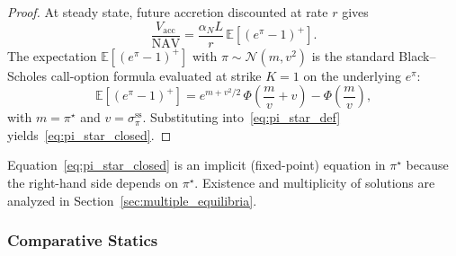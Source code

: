 \begin{proof}
  At steady state, future accretion discounted at rate $r$ gives
  \[
    \frac{V_{\mathrm{acc}}}{\mathrm{NAV}}
    = \frac{\alpha_N L}{r}\,\mathbb{E}[(e^\pi - 1)^+].
  \]
  The expectation $\mathbb{E}[(e^\pi - 1)^+]$ with
  $\pi \sim \mathcal{N}(m, v^2)$ is the standard Black--Scholes call-option
  formula evaluated at strike $K=1$ on the underlying $e^\pi$:
  \[
    \mathbb{E}[(e^\pi - 1)^+]
    = e^{m + v^2/2}\,\Phi\!\left(\frac{m}{v} + v\right)
      - \Phi\!\left(\frac{m}{v}\right),
  \]
  with $m = \pi^\star$ and $v = \sigma_\pi^{\mathrm{ss}}$.
  Substituting into~\eqref{eq:pi_star_def} yields~\eqref{eq:pi_star_closed}.
\end{proof}

\begin{remark}
  Equation~\eqref{eq:pi_star_closed} is an implicit (fixed-point) equation in
  $\pi^\star$ because the right-hand side depends on $\pi^\star$.
  Existence and multiplicity of solutions are analyzed in
  Section~\ref{sec:multiple_equilibria}.
\end{remark}

\subsubsection{Comparative Statics}
\label{sec:comparative_statics}


